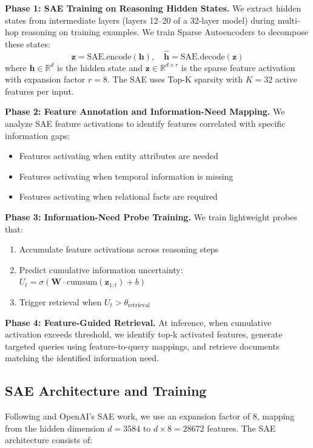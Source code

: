 \documentclass{article}
\begin{document}
\textbf{Phase 1: SAE Training on Reasoning Hidden States.} We extract hidden states from intermediate layers (layers 12--20 of a 32-layer model) during multi-hop reasoning on training examples. We train Sparse Autoencoders to decompose these states:
\begin{equation}
\mathbf{z} = \text{SAE.encode}(\mathbf{h}), \quad \hat{\mathbf{h}} = \text{SAE.decode}(\mathbf{z})
\end{equation}
where $\mathbf{h} \in \mathbb{R}^d$ is the hidden state and $\mathbf{z} \in \mathbb{R}^{d \times r}$ is the sparse feature activation with expansion factor $r=8$. The SAE uses Top-K sparsity with $K=32$ active features per input.

\textbf{Phase 2: Feature Annotation and Information-Need Mapping.} We analyze SAE feature activations to identify features correlated with specific information gaps:
\begin{itemize}
    \item Features activating when entity attributes are needed
    \item Features activating when temporal information is missing
    \item Features activating when relational facts are required
\end{itemize}

\textbf{Phase 3: Information-Need Probe Training.} We train lightweight probes that:
\begin{enumerate}
    \item Accumulate feature activations across reasoning steps
    \item Predict cumulative information uncertainty: $U_t = \sigma(\mathbf{W} \cdot \text{cumsum}(\mathbf{z}_{1:t}) + b)$
    \item Trigger retrieval when $U_t > \theta_{\text{retrieval}}$
\end{enumerate}

\textbf{Phase 4: Feature-Guided Retrieval.} At inference, when cumulative activation exceeds threshold, we identify top-k activated features, generate targeted queries using feature-to-query mappings, and retrieve documents matching the identified information need.

\subsection{SAE Architecture and Training}

Following \citet{raglens2026} and OpenAI's SAE work, we use an expansion factor of 8, mapping from the hidden dimension $d=3584$ to $d \times 8 = 28672$ features. The SAE architecture consists of:
\end{document}
